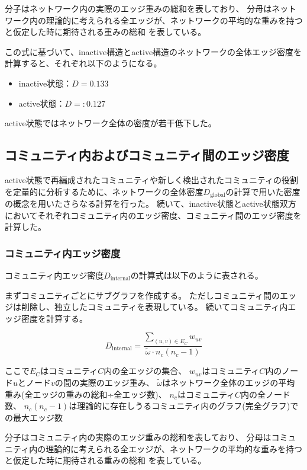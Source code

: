 分子はネットワーク内の実際のエッジ重みの総和を表しており、
分母はネットワーク内の理論的に考えられる全エッジが、ネットワークの平均的な重みを持つと仮定した時に期待される重みの総和
を表している。

この式に基づいて、inactive構造とactive構造のネットワークの全体エッジ密度を計算すると、それぞれ以下のようになる。
\begin{itemize}
    \item inactive状態：\( D = 0.133 \)
    \item active状態：\( D = :0.127 \)
\end{itemize}

active状態ではネットワーク全体の密度が若干低下した。

\subsection{コミュニティ内およびコミュニティ間のエッジ密度}
active状態で再編成されたコミュニティや新しく検出されたコミュニティの役割を定量的に分析するために、ネットワークの全体密度$D_{\text{global}}$の計算で用いた密度の概念を用いたさらなる計算を行った。
続いて、inactive状態とactive状態双方においてそれぞれコミュニティ内のエッジ密度、コミュニティ間のエッジ密度を計算した。

\subsubsection{コミュニティ内エッジ密度}
コミュニティ内エッジ密度$D_{\text{internal}}$の計算式は以下のように表される。

まずコミュニティごとにサブグラフを作成する。
ただしコミュニティ間のエッジは削除し、独立したコミュニティを表現している。
続いてコミュニティ内エッジ密度を計算する。

\begin{equation}
  D_{\text{internal}} = \frac{\sum_{(u,v) \in E_C} w_{uv}}{\tilde{\omega} \cdot n_c (n_c - 1)}
  \label{eq:internal_density}
  \end{equation}

ここで$E_C$はコミュニティ$C$内の全エッジの集合、
$w_{uv}$はコミュニティ$C$内のノード$u$とノード$v$の間の実際のエッジ重み、
$\tilde{\omega}$はネットワーク全体のエッジの平均重み(全エッジの重みの総和÷全エッジ数)、
$n_c$はコミュニティ$C$内の全ノード数、
$n_c (n_c - 1)$は理論的に存在しうるコミュニティ内のグラフ(完全グラフ)での最大エッジ数

分子はコミュニティ内の実際のエッジ重みの総和を表しており、
分母はコミュニティ内の理論的に考えられる全エッジが、ネットワークの平均的な重みを持つと仮定した時に期待される重みの総和
を表している。

